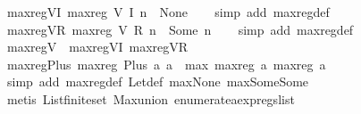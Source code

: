 \begin{isabellebody}
\ max{\isacharunderscore}reg{\isacharunderscore}V{\isacharunderscore}I{\isacharcolon}\ {\isachardoublequoteopen}max{\isacharunderscore}reg\ {\isacharparenleft}V\ {\isacharparenleft}I\ n{\isacharparenright}{\isacharparenright}\ {\isacharequal}\ None{\isachardoublequoteclose}\isanewline
%
\isadelimproof
\ \ %
\endisadelimproof
%
\isatagproof
{}\isamarkupfalse%
\ {\isacharparenleft}simp\ add{\isacharcolon}\ max{\isacharunderscore}reg{\isacharunderscore}def{\isacharparenright}%
\endisatagproof
{\isafoldproof}%
%
\isadelimproof
\isanewline
%
\endisadelimproof
\isanewline
{}\isamarkupfalse%
\ max{\isacharunderscore}reg{\isacharunderscore}V{\isacharunderscore}R{\isacharcolon}\ {\isachardoublequoteopen}max{\isacharunderscore}reg\ {\isacharparenleft}V\ {\isacharparenleft}R\ n{\isacharparenright}{\isacharparenright}\ {\isacharequal}\ Some\ n{\isachardoublequoteclose}\isanewline
%
\isadelimproof
\ \ %
\endisadelimproof
%
\isatagproof
{}\isamarkupfalse%
\ {\isacharparenleft}simp\ add{\isacharcolon}\ max{\isacharunderscore}reg{\isacharunderscore}def{\isacharparenright}%
\endisatagproof
{\isafoldproof}%
%
\isadelimproof
\isanewline
%
\endisadelimproof
\isanewline
{}\isamarkupfalse%
\ max{\isacharunderscore}reg{\isacharunderscore}V\ {\isacharequal}\ max{\isacharunderscore}reg{\isacharunderscore}V{\isacharunderscore}I\ max{\isacharunderscore}reg{\isacharunderscore}V{\isacharunderscore}R\isanewline
\isanewline
{}\isamarkupfalse%
\ max{\isacharunderscore}reg{\isacharunderscore}Plus{\isacharcolon}\ {\isachardoublequoteopen}max{\isacharunderscore}reg\ {\isacharparenleft}Plus\ a{}\ a{}{\isacharparenright}\ {\isacharequal}\ max\ {\isacharparenleft}max{\isacharunderscore}reg\ a{}{\isacharparenright}\ {\isacharparenleft}max{\isacharunderscore}reg\ a{}{\isacharparenright}{\isachardoublequoteclose}\isanewline
%
\isadelimproof
\ \ %
\endisadelimproof
%
\isatagproof
{}\isamarkupfalse%
\ {\isacharparenleft}simp\ add{\isacharcolon}\ max{\isacharunderscore}reg{\isacharunderscore}def\ Let{\isacharunderscore}def\ max{\isacharunderscore}None\ max{\isacharunderscore}Some{\isacharunderscore}Some{\isacharparenright}\isanewline
\ \ \isamarkupfalse%
\ {\isacharparenleft}metis\ List{\isachardot}finite{\isacharunderscore}set\ Max{\isachardot}union\ enumerate{\isacharunderscore}aexp{\isacharunderscore}regs{\isacharunderscore}list{\isacharparenright}%
\endisatagproof
{\isafoldproof}%
%
\isadelimproof
\isanewline
%
\endisadelimproof
\isanewline
{}\isamarkupfalse%

\end{isabellebody}
